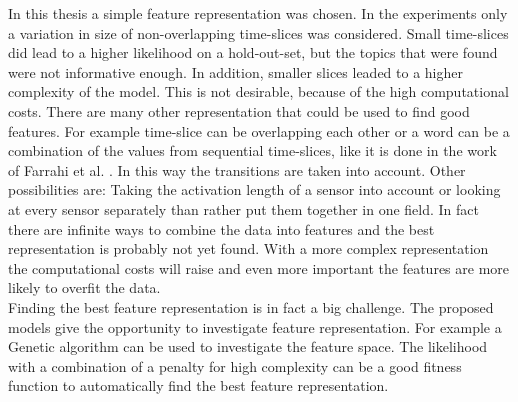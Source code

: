 In this thesis a simple feature representation was chosen. In the experiments only a variation in size of non-overlapping time-slices was considered. Small time-slices did lead to a higher likelihood on a hold-out-set, but the topics that were found were not informative enough. In addition, smaller slices leaded to a higher complexity of the model. This is not desirable, because of the high computational costs.
There are many other representation that could be used to find good features. For example time-slice can be overlapping each other or a word can be a combination of the values from sequential time-slices, like it is done in the work of Farrahi et al. \cite{farrahi2008daily}. In this way the transitions are taken into account. Other possibilities are: Taking the activation length of a sensor into account or looking at every sensor separately than rather put them together in one field. In fact there are infinite ways to combine the data into features and the best representation is probably not yet found. With a more complex representation the computational costs will raise and even more important the features are more likely to overfit the data.\\

Finding the best feature representation is in fact a big challenge. The proposed models give the opportunity to investigate feature representation. For example a Genetic algorithm can be used to investigate the feature space. The likelihood with a combination of a penalty for high complexity can be a good fitness function to automatically find the best feature representation.











